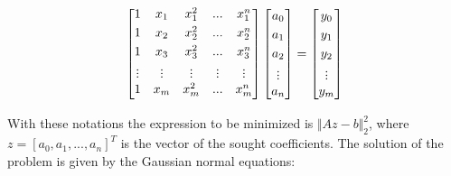 \documentclass[margin=0px]{article}
\begin{document}
\begin{displaymath}
    \begin{bmatrix}
        1                             & x_{1}                         & x_{1}^{2}                     & ...                           & x_{1}^{n}                     \\[0.3em]
        1                             & x_{2}                         & x_{2}^{2}                     & ...                           & x_{2}^{n}                     \\[0.3em]
        1                             & x_{3}                         & x_{3}^{2}                     & ...                           & x_{3}^{n}                     \\[0.3em]
        \rotatebox[origin=c]{90}{...} & \rotatebox[origin=c]{90}{...} & \rotatebox[origin=c]{90}{...} & \rotatebox[origin=c]{90}{...} & \rotatebox[origin=c]{90}{...} \\[0.3em]
        1                             & x_{m}                         & x_{m}^{2}                     & ...                           & x_{m}^{n}                     \\[0.3em]
    \end{bmatrix}
    \begin{bmatrix}
        a_{0}                         \\[0.3em]
        a_{1}                         \\[0.3em]
        a_{2}                         \\[0.3em]
        \rotatebox[origin=c]{90}{...} \\[0.3em]
        a_{n}
    \end{bmatrix}
    =
    \begin{bmatrix}
        y_{0}                         \\[0.3em]
        y_{1}                         \\[0.3em]
        y_{2}                         \\[0.3em]
        \rotatebox[origin=c]{90}{...} \\[0.3em]
        y_{m}
    \end{bmatrix}
\end{displaymath}

With these notations the expression to be minimized is $\Vert Az - b \Vert_{2}^{2}$, where $z = [a_{0},a_{1}, ..., a_{n}]^{T}$
is the vector of the sought coefficients. The solution of the problem is given by the Gaussian normal equations:
\end{document}
